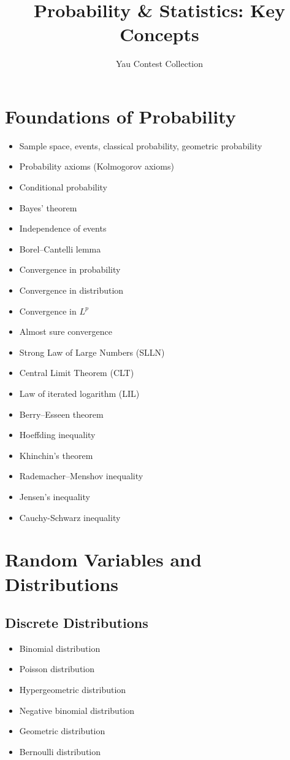 \documentclass{amsart}
\title{Probability \& Statistics: Key Concepts}
\author{Yau Contest Collection}
\date{}
\begin{document}
\maketitle

\section{Foundations of Probability}

\begin{itemize}
  \item Sample space, events, classical probability, geometric probability
  \item Probability axioms (Kolmogorov axioms)
  \item Conditional probability
  \item Bayes' theorem
  \item Independence of events
  \item Borel--Cantelli lemma
  \item Convergence in probability
  \item Convergence in distribution
  \item Convergence in $L^p$
  \item Almost sure convergence
  \item Strong Law of Large Numbers (SLLN)
  \item Central Limit Theorem (CLT)
  \item Law of iterated logarithm (LIL)
  \item Berry--Esseen theorem
  \item Hoeffding inequality
  \item Khinchin's theorem
  \item Rademacher--Menshov inequality
  \item Jensen's inequality
  \item Cauchy-Schwarz inequality
\end{itemize}

\section{Random Variables and Distributions}

\subsection{Discrete Distributions}
\begin{itemize}
  \item Binomial distribution
  \item Poisson distribution
  \item Hypergeometric distribution
  \item Negative binomial distribution
  \item Geometric distribution
  \item Bernoulli distribution
\end{itemize}
\end{document}
